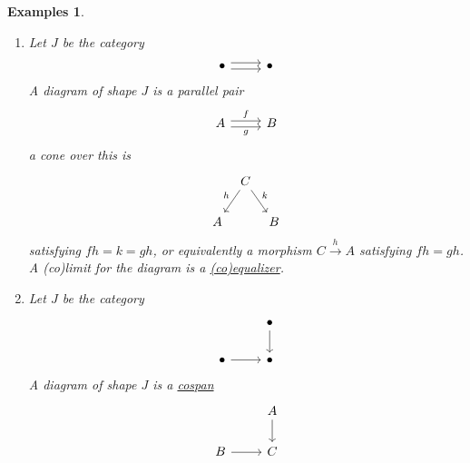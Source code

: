\documentclass{article}
\let\to\longrightarrow
\newtheorem{nexample}[nthm]{Examples}
\begin{document}
\begin{nexample}
\begin{enumerate}[label=(\alph*)]
      \begin{equation*}
        \Set{\prod_{j \in J} A_j \overset{\pi_j}\to A_j | j \in J}.
      \end{equation*}
      Dually, a colimit for it is a coproduct
      \begin{equation*}
        \Set{A_j \overset{\nu_j}\to \sum_{j \in J} A_j | j \in J},
      \end{equation*}
      also written $\coprod_{j \in J} A_j$.
    \item Let $J$ be the category
      \begin{equation*}
        \begin{tikzcd}
          \bullet \rar[shift left] \rar[shift right] & \bullet
        \end{tikzcd}
      \end{equation*}
      A diagram of shape $J$ is a parallel pair
      \begin{equation*}
      \begin{tikzcd}
        A \rar[shift left]{f} \rar[shift right, ']{g} & B
      \end{tikzcd}
      \end{equation*} a cone over this is
      \begin{equation*}
        \begin{tikzcd}[column sep=tiny]
          & \arrow[dl, "h"'] C \drar{k} \\
          A && B
        \end{tikzcd}
      \end{equation*}
      satisfying $fh = k = gh$, or equivalently a morphism $C \overset{h}\to A$ satisfying $fh = gh$.
      A (co)limit for the diagram is a \hyperlink{def:equalizer}{(co)equalizer}.
    \item Let $J$ be the category
      \begin{equation*}
        \begin{tikzcd}
          & \bullet \dar \\
          \bullet \rar & \bullet
        \end{tikzcd}
      \end{equation*}
      A diagram of shape $J$ is a \hyperlink{def:span}{cospan}
      \begin{equation*}
        \begin{tikzcd}
          & A \dar \\
          B \rar & C
        \end{tikzcd}
      \end{equation*}

\end{enumerate}
\end{nexample}
\end{document}
